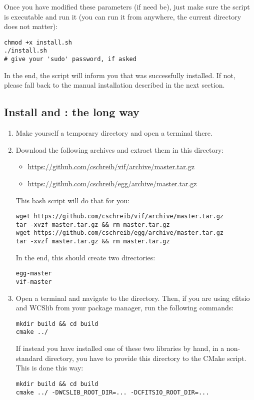 Once you have modified these parameters (if need be), just make sure the script is executable and run it (you can run it from anywhere, the current directory does not matter):
\begin{verbatim}
chmod +x install.sh
./install.sh
# give your 'sudo' password, if asked
\end{verbatim}

In the end, the script will inform you that \egg was successfully installed. If not, please fall back to the manual installation described in the next section.

\subsection{Install \vif and \egg: the long way}


\begin{enumerate}
\item Make yourself a temporary directory and open a terminal there.
\item Download the following archives and extract them in this directory:
\begin{itemize}
\item \url{https://github.com/cschreib/vif/archive/master.tar.gz}
\item \url{https://github.com/cschreib/egg/archive/master.tar.gz}
\end{itemize}

This bash script will do that for you:
\begin{verbatim}
wget https://github.com/cschreib/vif/archive/master.tar.gz
tar -xvzf master.tar.gz && rm master.tar.gz
wget https://github.com/cschreib/egg/archive/master.tar.gz
tar -xvzf master.tar.gz && rm master.tar.gz
\end{verbatim}

In the end, this should create two directories:
\begin{verbatim}
egg-master
vif-master
\end{verbatim}

\item Open a terminal and navigate to the  directory. Then, if you are using cfitsio and WCSlib from your package manager, run the following commands:
\begin{verbatim}
mkdir build && cd build
cmake ../
\end{verbatim}

If instead you have installed one of these two libraries by hand, in a non-standard directory, you have to provide this directory to the CMake script. This is done this way:
\begin{verbatim}
mkdir build && cd build
cmake ../ -DWCSLIB_ROOT_DIR=... -DCFITSIO_ROOT_DIR=...
\end{verbatim}


\end{enumerate}
